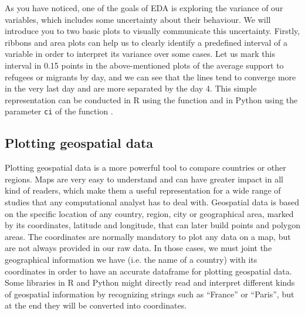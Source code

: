 
As you have noticed, one of the goals of EDA is exploring the variance of our variables, which includes some uncertainty about their behaviour. We will introduce you to two basic plots to visually communicate this uncertainty. Firstly, ribbons and area plots can help us to clearly identify a predefined interval of a variable in order to interpret its variance over some cases. Let us mark this interval in 0.15 points in the above-mentioned plots of the average support to refugees or migrants by day, and we can see that the lines tend to converge more in the very last day and are more separated by the day 4. This simple representation can be conducted in R using the  function  and in Python using the parameter \texttt{ci} of the  function .  





\subsection{Plotting geospatial data}

Plotting geospatial data is a more powerful tool to compare countries or other regions.  Maps are very easy to understand and can have greater impact in all kind of readers, which make them a useful representation for a wide range of studies that any computational analyst has to deal with. Geospatial data is based on the specific location of any country, region, city or geographical area, marked by its coordinates, latitude and longitude, that can later build points and polygon areas. The coordinates are normally mandatory to plot any data on a map, but are not always provided in our raw data. In those cases, we must joint the geographical information we have (i.e. the name of a country) with its coordinates in order to have an accurate dataframe for plotting geospatial data. Some libraries in R and Python might directly read and interpret different kinds of geospatial information by recognizing strings such as “France” or “Paris”, but at the end they will be converted into coordinates. 

